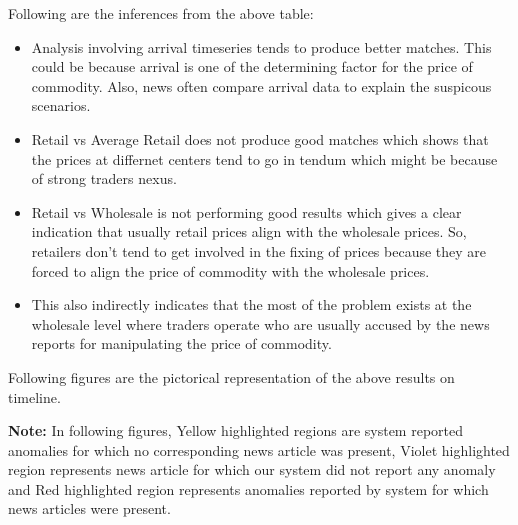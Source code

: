 \documentclass[a4paper,10pt]{article}
\begin{document}
Following are the inferences from the above table:
\begin{itemize}
 \item Analysis involving arrival timeseries tends to produce better matches. This could be because arrival is one of the determining factor for the price of commodity. Also, news often compare arrival data to explain the suspicous scenarios.
 \item Retail vs Average Retail does not produce good matches which shows that the prices at differnet centers tend to go in tendum which might be because of strong traders nexus.
 \item Retail vs Wholesale is not performing good results which gives a clear indication that usually retail prices align with the wholesale prices. So, retailers don't tend to get involved in the fixing of prices because they are forced to align the price of commodity with the wholesale prices.
 \item This also indirectly indicates that the most of the problem exists at the wholesale level where traders operate who are usually accused by the news reports for manipulating the price of commodity.
\end{itemize}



Following figures are the pictorical representation of the above results on timeline.

\textbf{Note:} In following figures, Yellow highlighted regions are system reported anomalies for which no corresponding news article was present, Violet highlighted region represents news article for which our system did not report any anomaly and Red highlighted region represents anomalies reported by system for which news articles were present.
\end{document}
